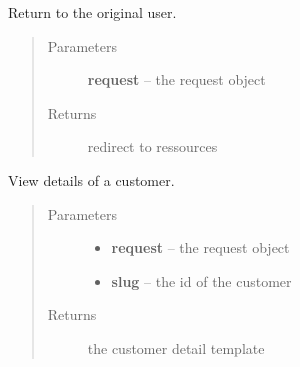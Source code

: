 \documentclass[letterpaper,10pt,english]{sphinxmanual}
\begin{document}
\begin{fulllineitems}
\label{api/system:limeade.system.views.customer_manage_return}
Return to the original user.
\begin{quote}\begin{description}
\item[{Parameters}] \leavevmode
\textbf{request} -- the request object

\item[{Returns}] \leavevmode
redirect to ressources

\end{description}\end{quote}

\end{fulllineitems}


\begin{fulllineitems}
\label{api/system:limeade.system.views.customer_view}
View details of a customer.
\begin{quote}\begin{description}
\item[{Parameters}] \leavevmode\begin{itemize}
\item {} 
\textbf{request} -- the request object

\item {} 
\textbf{slug} -- the id of the customer

\end{itemize}

\item[{Returns}] \leavevmode
the customer detail template

\end{description}\end{quote}

\end{fulllineitems}

\end{document}
